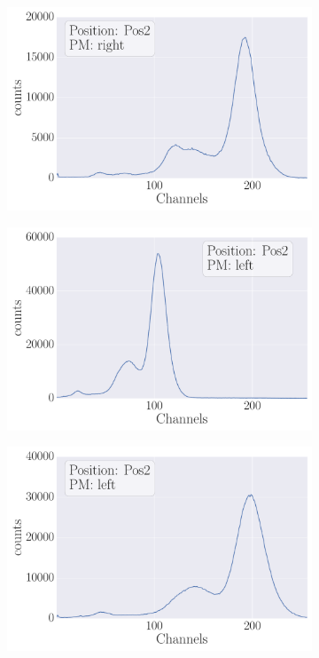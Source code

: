 \begin{figure}
    \begin{subfigure}[b]{\picwidth}
        \includegraphics[width=\textwidth]{analysis/figures/plot2_1c}
        \caption{}
    \end{subfigure}
    \begin{subfigure}[b]{\picwidth}
        \includegraphics[width=\textwidth]{analysis/figures/plot2_1d}
        \caption{}
    \end{subfigure}
    \begin{subfigure}[b]{\picwidth}
        \includegraphics[width=\textwidth]{analysis/figures/plot2_1e}

\end{subfigure}
\end{figure}

